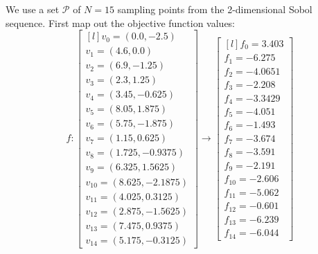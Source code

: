 We use a set $\mathcal{P}$ of $N=15$ sampling points from the 2-dimensional Sobol sequence. First map out the objective function values:
\begin{equation} \label{eq:ursemmap}
f:
\begin{bmatrix} [l]
v_{0} = (0.0, -2.5) \\
v_{1} = (4.6, 0.0) \\
v_{2} = (6.9, -1.25) \\
v_{3} = (2.3, 1.25) \\
v_{4} = (3.45, -0.625) \\
v_{5} = (8.05, 1.875) \\
v_{6} = (5.75, -1.875) \\
v_{7} = (1.15, 0.625) \\
v_{8} = (1.725, -0.9375) \\
v_{9} = (6.325, 1.5625) \\
v_{10} = (8.625, -2.1875) \\
v_{11} = (4.025, 0.3125) \\
v_{12} = (2.875, -1.5625) \\
v_{13} = (7.475, 0.9375) \\
v_{14} = (5.175, -0.3125)  
\end{bmatrix}
\rightarrow
\begin{bmatrix} [l]
f_{0} = 3.403\\
f_{1} = -6.275\\
f_{2} = -4.0651\\
f_{3} = -2.208\\
f_{4} = -3.3429\\
f_{5} = -4.051\\
f_{6} = -1.493\\
f_{7} = -3.674\\
f_{8} = -3.591\\
f_{9} = -2.191\\
f_{10} = -2.606\\
f_{11} = -5.062\\
f_{12} = -0.601\\
f_{13} = -6.239\\
f_{14} = -6.044
\end{bmatrix}
\end{equation}

